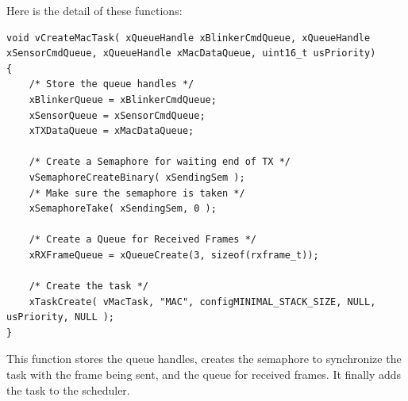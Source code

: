 \documentclass[11pt]{report}
\begin{document}
Here is the detail of these functions:

\begin{verbatim}
void vCreateMacTask( xQueueHandle xBlinkerCmdQueue, xQueueHandle xSensorCmdQueue, xQueueHandle xMacDataQueue, uint16_t usPriority)
{
    /* Store the queue handles */
    xBlinkerQueue = xBlinkerCmdQueue;
    xSensorQueue = xSensorCmdQueue;
    xTXDataQueue = xMacDataQueue;
    
    /* Create a Semaphore for waiting end of TX */
    vSemaphoreCreateBinary( xSendingSem );
    /* Make sure the semaphore is taken */
    xSemaphoreTake( xSendingSem, 0 );
    
    /* Create a Queue for Received Frames */
    xRXFrameQueue = xQueueCreate(3, sizeof(rxframe_t));
    
    /* Create the task */
    xTaskCreate( vMacTask, "MAC", configMINIMAL_STACK_SIZE, NULL, usPriority, NULL );
}
\end{verbatim}
This function stores the queue handles, creates the semaphore to synchronize the task with the frame being sent, and the queue for received frames. It finally adds the task to the scheduler.
\end{document}
